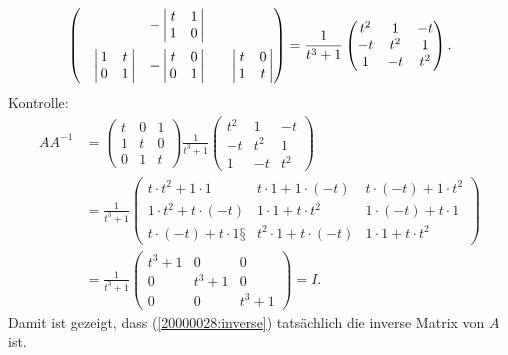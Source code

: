 \begin{loesung}
\begin{align}
\begin{pmatrix}
		&-\left|\,\begin{matrix}t&1\\1&0\end{matrix}\,\right|
			\\[11pt]
\phantom{-}\left|\,\begin{matrix}1&t\\0&1\end{matrix}\,\right|
	&-\left|\,\begin{matrix}t&0\\0&1\end{matrix}\,\right|
		&\phantom{-}\left|\,\begin{matrix}t&0\\1&t\end{matrix}\,\right|
\end{pmatrix}
=\frac1{t^3+1}
\renewcommand{\arraystretch}{1}
\begin{pmatrix}
t^2&  1& -t\\
 -t&t^2&  1\\
  1& -t&t^2
\end{pmatrix}.
\label{20000028:inverse}
\end{align}
Kontrolle:
\begin{align*}
AA^{-1}
&=
\begin{pmatrix}
t&0&1\\
1&t&0\\
0&1&t
\end{pmatrix}
\frac{1}{t^3+1}
\begin{pmatrix}
t^2&  1& -t\\
 -t&t^2&  1\\
  1& -t&t^2
\end{pmatrix}
\\
&=
\frac{1}{t^3+1}
\begin{pmatrix}
t\cdot t^2+1\cdot 1
	&t\cdot 1+1\cdot(-t)
		&t\cdot(-t)+1\cdot t^2\\
1\cdot t^2+t\cdot (-t)
	&1\cdot 1+t\cdot t^2
		&1\cdot(-t)+t\cdot 1\\
t\cdot (-t)+t\cdot 1§
	&t^2\cdot 1+t\cdot (-t)
		&1\cdot 1+t\cdot t^2
\end{pmatrix}
\\
&=
\frac1{t^3+1}
\begin{pmatrix}
t^3+1&    0&    0\\
    0&t^3+1&    0\\
    0&    0&t^3+1
\end{pmatrix}=I.
\end{align*}
Damit ist gezeigt, dass (\ref{20000028:inverse}) tatsächlich die inverse Matrix
von $A$ ist.
\end{loesung}
